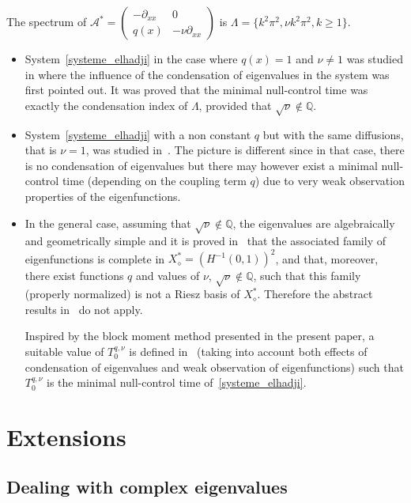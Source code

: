 \documentclass[10pt]{amsart}
\theoremstyle{definition}\newtheorem{defi}[theo]{Definition}\newtheorem{rema}[theo]{Remark}\newtheorem{exam}[theo]{Example}\newtheorem{exem}[theo]{Example}\newtheorem{nota}[theo]{Notation}
\newcommand\As{\mathcal{A}^*}
\newcommand{\Xalphas}{X_\diamond^*}
\begin{document}
The spectrum of $\As=
\begin{pmatrix} -\partial_{xx} & 0 \\ q(x) & -\nu \partial_{xx}
\end{pmatrix}$ is $\Lambda = \{ k^2 \pi^2 , \nu k^2 \pi^2, k\geq 1 \}$.
\begin{itemize}
\item System~\eqref{systeme_elhadji} in the case where $q(x)=1$ and $\nu\neq 1$ was studied in\linebreak \cite{AmmarKhodjaBenabdallahGonzalez-BurgosdeTeresa:2014} where the influence of the condensation of eigenvalues in the system was first pointed out. It was proved that the minimal null-control time was exactly the condensation index of $\Lambda$, provided that $\sqrt{\nu}\not\in \mathbb Q$.
\item System~\eqref{systeme_elhadji} with a non constant $q$ but with the same diffusions, that is $\nu=1$, was studied in~\cite{AKBGBdT_JMAA16}. The picture is different since in that case, there is no condensation of eigenvalues but there may however exist a minimal null-control time (depending on the coupling term $q$) due to very weak observation properties of the eigenfunctions.
\item In the general case, assuming that $\sqrt{\nu}\not\in \mathbb Q$, the eigenvalues are algebraically and geometrically simple and it is proved in~\cite{Samb18} that the associated family of eigenfunctions is complete in $\Xalphas=(H^{-1}(0,1))^2$, and that, moreover, there exist functions $q$ and values of $\nu$, $\sqrt{\nu}\not\in \mathbb Q$, such that this family (properly normalized) is not a Riesz basis of $\Xalphas$. Therefore the abstract results in~\cite{AmmarKhodjaBenabdallahGonzalez-BurgosdeTeresa:2014,AKBGBdT_JMAA16} do not apply.

Inspired by the block moment method presented in the present paper, a suitable value of $T_0^{q,\nu}$ is defined in~\cite{Samb18} (taking into account both effects of condensation of eigenvalues and weak observation of eigenfunctions) such that $T_0^{q,\nu}$ is the minimal null-control time of~\eqref{systeme_elhadji}.
\end{itemize}



\section{Extensions} \label{Sec:Extensions}


\subsection{Dealing with complex eigenvalues} \label{Subsec:ValeurPropresComplexes}
\end{document}
